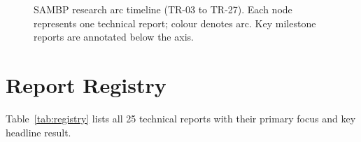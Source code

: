 \documentclass[11pt,a4paper]{article}
\begin{document}
\begin{figure}[h!]
  \centering
  \resizebox{\textwidth}{!}{}
  \caption{SAMBP research arc timeline (TR-03 to TR-27).
           Each node represents one technical report; colour denotes arc.
           Key milestone reports are annotated below the axis.}
  \label{fig:timeline}
\end{figure}

\section{Report Registry}

Table~\ref{tab:registry} lists all 25 technical reports with their
primary focus and key headline result.
\end{document}
